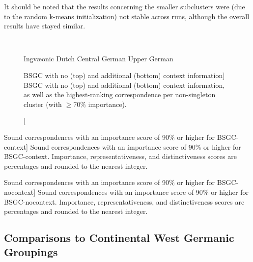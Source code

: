 \documentclass[a4paper]{article}
\def\upper{\color{purple}\FilledBigTriangleUp}
\def\central{\color{midblue}\FilledBigSquare}
\def\dutch{\color{green}\FilledBigCircle}
\def\ingv{\color{green}\BigCircle}
\begin{document}
It should be noted that the results concerning
the smaller subclusters were
(due to the random k-means initialization) not stable
across runs, although the overall results have stayed similar.

\begin{figure}[h]
\begin{adjustwidth}{-1cm}{0cm}
\centering
\\
\vspace{2em}

\end{adjustwidth}

\vspace{0.3em}
\begin{center}
{\ingv} Ingv\ae{}onic \hspace{1em}
{\dutch} Dutch \hspace{1em}
{\central} Central German \hspace{1em}
{\upper} Upper German
\end{center}
\caption
[BSGC with no (top) and additional (bottom) context information]
{BSGC with no (top) and additional (bottom) context information,
as well as the highest-ranking correspondence per non-singleton cluster
(with $\geq$70\% importance).}
\label{fig:bsgc-trees}
\end{figure}

\begin{table}[h]
\centering

\caption
[Sound correspondences with an importance score of 90\% or higher for BSGC-context]
{Sound correspondences with an importance score of 90\% or higher for BSGC-context.
Importance, representativeness, and distinctiveness scores are percentages
and rounded to the nearest integer.
}
\label{tab:bsgc-context-corres}
\end{table}
\FloatBarrier

\begin{table}[H]
\centering

\caption
[Sound correspondences with an importance score of 90\% or higher for BSGC-nocontext]
{Sound correspondences with an importance score of 90\% or higher for BSGC-nocontext.
Importance, representativeness, and distinctiveness scores are percentages
and rounded to the nearest integer.
}
\label{tab:bsgc-nocontext-corres}
\end{table}

\subsection{Comparisons to Continental West Germanic Groupings}
\end{document}
